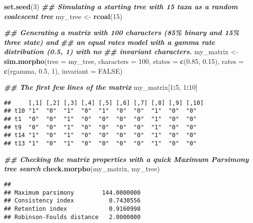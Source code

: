 \documentclass[
]{book}
\newenvironment{Shaded}{\begin{snugshade}}{\end{snugshade}}
\newcommand{\AttributeTok}[1]{\textcolor[rgb]{0.13,0.29,0.53}{#1}}
\newcommand{\ConstantTok}[1]{\textcolor[rgb]{0.56,0.35,0.01}{#1}}
\newcommand{\DecValTok}[1]{\textcolor[rgb]{0.00,0.00,0.81}{#1}}
\newcommand{\DocumentationTok}[1]{\textcolor[rgb]{0.56,0.35,0.01}{\textbf{\textit{#1}}}}
\newcommand{\FloatTok}[1]{\textcolor[rgb]{0.00,0.00,0.81}{#1}}
\newcommand{\FunctionTok}[1]{\textcolor[rgb]{0.13,0.29,0.53}{\textbf{#1}}}
\newcommand{\NormalTok}[1]{#1}
\newcommand{\OtherTok}[1]{\textcolor[rgb]{0.56,0.35,0.01}{#1}}
\newcommand{\SpecialCharTok}[1]{\textcolor[rgb]{0.81,0.36,0.00}{\textbf{#1}}}
\begin{document}
\begin{Shaded}
\begin{Highlighting}[]
\FunctionTok{set.seed}\NormalTok{(}\DecValTok{3}\NormalTok{)}
\DocumentationTok{\#\# Simulating a starting tree with 15 taxa as a random coalescent tree}
\NormalTok{my\_tree }\OtherTok{\textless{}{-}} \FunctionTok{rcoal}\NormalTok{(}\DecValTok{15}\NormalTok{)}

\DocumentationTok{\#\# Generating a matrix with 100 characters (85\% binary and 15\% three state) and}
\DocumentationTok{\#\# an equal rates model with a gamma rate distribution (0.5, 1) with no }
\DocumentationTok{\#\# invariant characters.}
\NormalTok{my\_matrix }\OtherTok{\textless{}{-}} \FunctionTok{sim.morpho}\NormalTok{(}\AttributeTok{tree =}\NormalTok{ my\_tree, }\AttributeTok{characters =} \DecValTok{100}\NormalTok{, }\AttributeTok{states =} \FunctionTok{c}\NormalTok{(}\FloatTok{0.85}\NormalTok{,}
    \FloatTok{0.15}\NormalTok{), }\AttributeTok{rates =} \FunctionTok{c}\NormalTok{(rgamma, }\FloatTok{0.5}\NormalTok{, }\DecValTok{1}\NormalTok{), }\AttributeTok{invariant =} \ConstantTok{FALSE}\NormalTok{)}

\DocumentationTok{\#\# The first few lines of the matrix}
\NormalTok{my\_matrix[}\DecValTok{1}\SpecialCharTok{:}\DecValTok{5}\NormalTok{, }\DecValTok{1}\SpecialCharTok{:}\DecValTok{10}\NormalTok{]}
\end{Highlighting}
\end{Shaded}

\begin{verbatim}
##     [,1] [,2] [,3] [,4] [,5] [,6] [,7] [,8] [,9] [,10]
## t10 "1"  "0"  "1"  "0"  "1"  "0"  "0"  "1"  "0"  "0"  
## t1  "0"  "0"  "1"  "0"  "0"  "0"  "0"  "1"  "0"  "0"  
## t9  "0"  "0"  "1"  "0"  "0"  "0"  "0"  "1"  "0"  "0"  
## t14 "1"  "0"  "1"  "0"  "0"  "0"  "0"  "1"  "0"  "0"  
## t13 "1"  "0"  "1"  "0"  "0"  "0"  "0"  "1"  "0"  "0"
\end{verbatim}

\begin{Shaded}
\begin{Highlighting}[]
\DocumentationTok{\#\# Checking the matrix properties with a quick Maximum Parsimony tree search}
\FunctionTok{check.morpho}\NormalTok{(my\_matrix, my\_tree)}
\end{Highlighting}
\end{Shaded}

\begin{verbatim}
##                                     
## Maximum parsimony        144.0000000
## Consistency index          0.7430556
## Retention index            0.9160998
## Robinson-Foulds distance   2.0000000
\end{verbatim}
\end{document}
